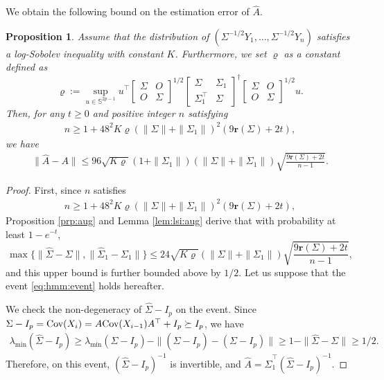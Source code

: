 \documentclass[11pt,a4paper]{article}
\newtheorem{proposition}[theorem]{Proposition}
\theoremstyle{remark}
\theoremstyle{definition}
\newcommand{\bX}{X}
\newcommand{\bY}{Y}
\newcommand{\bu}{u}
\newcommand{\bfA}{A}
\newcommand{\bfI}{I}
\newcommand{\bfO}{O}
\newcommand{\bSigma}{\Sigma}
\newcommand{\bbS}{\mathbb{S}}
\newcommand{\Cov}{\textnormal{Cov}}
\newcommand{\er}{\mathbf{r}}
\theoremstyle{definition}
\renewcommand{\hat}{\widehat}
\begin{document}
\begin{bibunit}[apalike]
We obtain the following bound on the estimation error of $\hat{\bfA}$.
\begin{proposition}
Assume that the distribution of $(\bSigma^{-1/2}\bY_{1},\ldots,\bSigma^{-1/2}\bY_{n})$ satisfies a log-Sobolev inequality with constant $K$.
Furthermore, we set $\varrho$ as a constant defined as
\begin{equation*}
    \varrho:=\sup_{\bu\in\bbS^{2p-1}}\bu^{\top}\left[\begin{matrix}
        \bSigma & \bfO\\
        \bfO & \bSigma
    \end{matrix}\right]^{1/2}\left[\begin{matrix}
        \bSigma & \bSigma_{1}\\
        \bSigma_{1}^{\top} & \bSigma
    \end{matrix}\right]^{\dagger}
    \left[\begin{matrix}
        \bSigma & \bfO\\
        \bfO & \bSigma
    \end{matrix}\right]^{1/2}\bu.
\end{equation*}
Then, for any $t\ge0$ and positive integer $n$ satisfying 
\begin{align*}
  n\ge 1+48^{2}K\varrho(\|\bSigma\|+\|\bSigma_{1}\|)^{2}(9\er(\bSigma)+2t),
\end{align*}
we have
\begin{align*}
    \|\hat{\bfA}-\bfA\|\le 96\sqrt{K\varrho}\left(1+\|\bSigma_{1}\|\right)(\|\bSigma\|+\|\bSigma_{1}\|)\sqrt{\frac{9\er(\bSigma)+2t}{n-1}}.
\end{align*}
\end{proposition}
\begin{proof}
First, since $n$ satisfies
\begin{align*}
  n\ge 1+48^{2}K\varrho(\|\bSigma\|+\|\bSigma_{1}\|)^{2}(9\er(\bSigma)+2t),
\end{align*}
Proposition \ref{prp:aug} and Lemma \ref{lem:lsi:aug} derive that with probability at least $1-e^{-t}$,
\begin{equation}\label{eq:hmm:event}
  \max\{\|\hat{\bSigma}-\bSigma\|,\|\hat{\bSigma}_{1}-\bSigma_{1}\|\}\le 24\sqrt{K\varrho}(\|\bSigma\|+\|\bSigma_{1}\|)\sqrt{\frac{9\er(\bSigma)+2t}{n-1}},
\end{equation}
and this upper bound is further bounded above by $1/2$.
Let us suppose that the event \eqref{eq:hmm:event} holds hereafter.

We check the non-degeneracy of $\hat{\bSigma}-\bfI_{p}$ on the event.
Since $\bSigma-\bfI_{p}=\Cov(\bX_{i})=\bfA\Cov(\bX_{i-1})\bfA^{\top}+\bfI_{p}\succeq\bfI_{p}$, we have
\begin{align*}
  \lambda_{\min}(\hat{\bSigma}-\bfI_{p})\ge \lambda_{\min}(\bSigma-\bfI_{p})- \|(\hat{\bSigma}-\bfI_{p})-(\bSigma-\bfI_{p})\|\ge 1-\|\hat{\bSigma}-\bSigma\|\ge 1/2.
\end{align*}
Therefore, on this event, $(\hat{\bSigma}-\bfI_{p})^{-1}$ is invertible, and  $\hat{\bfA}=\hat{\bSigma}_{1}^{\top}(\hat{\bSigma}-\bfI_{p})^{-1}$.


\end{proof}
\end{bibunit}
\end{document}
